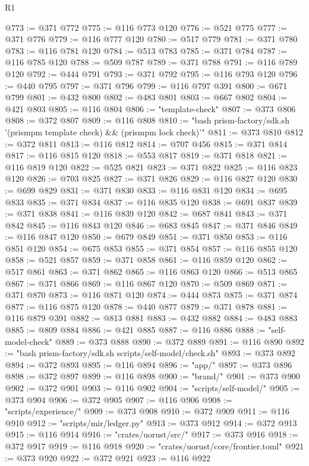 \begin{lexlean}{R1}
\begin{coremodule}
@773 := @371 @772
@775 := @116 @773 @120
@776 := @521 @775
@777 := @371 @776
@779 := @116 @777 @120
@780 := @517 @779
@781 := @371 @780
@783 := @116 @781 @120
@784 := @513 @783
@785 := @371 @784
@787 := @116 @785 @120
@788 := @509 @787
@789 := @371 @788
@791 := @116 @789 @120
@792 := @444 @791
@793 := @371 @792
@795 := @116 @793 @120
@796 := @440 @795
@797 := @371 @796
@799 := @116 @797 @391
@800 := @671 @799
@801 := @432 @800
@802 := @483 @801
@803 := @667 @802
@804 := @421 @803
@805 := @116 @804
@806 := "template-check"
@807 := @373 @806
@808 := @372 @807
@809 := @116 @808
@810 := "bash prism-factory/sdk.sh '(prismpm template check) && (prismpm lock check)'"
@811 := @373 @810
@812 := @372 @811
@813 := @116 @812
@814 := @707 @456
@815 := @371 @814
@817 := @116 @815 @120
@818 := @553 @817
@819 := @371 @818
@821 := @116 @819 @120
@822 := @525 @821
@823 := @371 @822
@825 := @116 @823 @120
@826 := @703 @825
@827 := @371 @826
@829 := @116 @827 @120
@830 := @699 @829
@831 := @371 @830
@833 := @116 @831 @120
@834 := @695 @833
@835 := @371 @834
@837 := @116 @835 @120
@838 := @691 @837
@839 := @371 @838
@841 := @116 @839 @120
@842 := @687 @841
@843 := @371 @842
@845 := @116 @843 @120
@846 := @683 @845
@847 := @371 @846
@849 := @116 @847 @120
@850 := @679 @849
@851 := @371 @850
@853 := @116 @851 @120
@854 := @675 @853
@855 := @371 @854
@857 := @116 @855 @120
@858 := @521 @857
@859 := @371 @858
@861 := @116 @859 @120
@862 := @517 @861
@863 := @371 @862
@865 := @116 @863 @120
@866 := @513 @865
@867 := @371 @866
@869 := @116 @867 @120
@870 := @509 @869
@871 := @371 @870
@873 := @116 @871 @120
@874 := @444 @873
@875 := @371 @874
@877 := @116 @875 @120
@878 := @440 @877
@879 := @371 @878
@881 := @116 @879 @391
@882 := @813 @881
@883 := @432 @882
@884 := @483 @883
@885 := @809 @884
@886 := @421 @885
@887 := @116 @886
@888 := "self-model-check"
@889 := @373 @888
@890 := @372 @889
@891 := @116 @890
@892 := "bash prism-factory/sdk.sh scripts/self-model/check.sh"
@893 := @373 @892
@894 := @372 @893
@895 := @116 @894
@896 := "app/"
@897 := @373 @896
@898 := @372 @897
@899 := @116 @898
@900 := "brand/"
@901 := @373 @900
@902 := @372 @901
@903 := @116 @902
@904 := "scripts/self-model/"
@905 := @373 @904
@906 := @372 @905
@907 := @116 @906
@908 := "scripts/experience/"
@909 := @373 @908
@910 := @372 @909
@911 := @116 @910
@912 := "scripts/mir/ledger.py"
@913 := @373 @912
@914 := @372 @913
@915 := @116 @914
@916 := "crates/uorust/src/"
@917 := @373 @916
@918 := @372 @917
@919 := @116 @918
@920 := "crates/uorust/core/frontier.toml"
@921 := @373 @920
@922 := @372 @921
@923 := @116 @922

\end{coremodule}
\end{lexlean}
